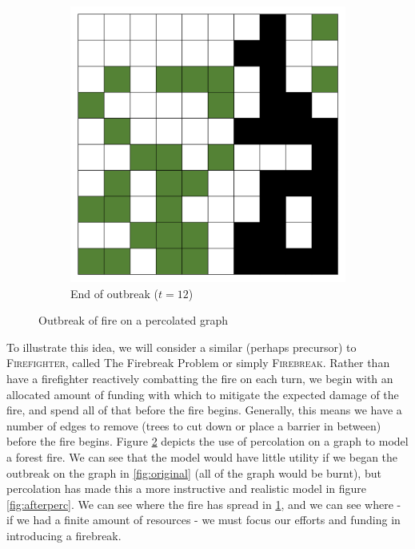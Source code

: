 \documentclass[11pt]{amsart}
\begin{document}
\begin{figure}[!ht]
  \begin{subfigure}{0.4\linewidth}
    \centering
    \includegraphics[width=0.4\linewidth]{firebreak/afteroutbreak} 
    \caption{End of outbreak ($t=12$)} 
    \label{fig:end} 
  \end{subfigure} 
  \caption{Outbreak of fire on a percolated graph}
  \label{fig:percolated_graph} 
\end{figure}

To illustrate this idea, we will consider a similar (perhaps precursor) to {\scshape Firefighter}, called The Firebreak Problem or simply {\scshape Firebreak}. Rather than have a firefighter reactively combatting the fire on each turn, we begin with an allocated amount of funding with which to mitigate the expected damage of the fire, and spend all of that before the fire begins. Generally, this means we have a number of edges to remove (trees to cut down or place a barrier in between) before the fire begins. Figure \ref{fig:percolated_graph} depicts the use of percolation on a graph to model a forest fire. We can see that the model would have little utility if we began the outbreak on the graph in \ref{fig:original} (all of the graph would be burnt), but percolation has made this a more instructive and realistic model in figure \ref{fig:afterperc}. We can see where the fire has spread in \ref{fig:end}, and we can see where - if we had a finite amount of resources - we must focus our efforts and funding in introducing a firebreak.\\
\end{document}
